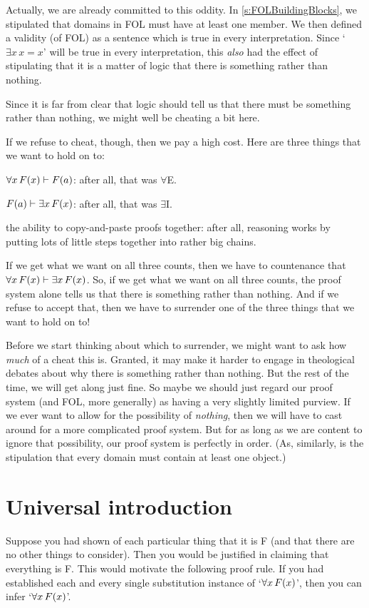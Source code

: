 Actually, we are already committed to this oddity. In \cref{s:FOLBuildingBlocks}, we stipulated that domains in FOL must have at least one member. We then defined a validity (of FOL) as a sentence which is true in every interpretation. Since `$\exists x\, x=x$' will be true in every interpretation, this \emph{also} had the effect of stipulating that it is a matter of logic that there is something rather than nothing.

Since it is far from clear that logic should tell us that there must be something rather than nothing, we might well be cheating a bit here.

If we refuse to cheat, though, then we pay a high cost. Here are three things that we want to hold on to:
	\begin{compactlist}
		\item $\forall x\,\mathord{F}(x) \vdash \mathord{F}(a)$: after all, that was $\forall$E.
		\item $\mathord{F}(a) \vdash \exists x\,\mathord{F}(x)$: after all, that was $\exists$I.
		\item the ability to copy-and-paste proofs together: after all, reasoning works by putting lots of little steps together into rather big chains.
	\end{compactlist}
If we get what we want on all three counts, then we have to countenance that $\forall x\,\mathord{F}(x) \vdash \exists x\,\mathord{F}(x)$. So, if we get what we want on all three counts, the proof system alone tells us that there is something rather than nothing. And if we refuse to accept that, then we have to surrender one of the three things that we want to hold on to!

Before we start thinking about which to surrender, we might want to ask how \emph{much} of a cheat this is. Granted, it may make it harder to engage in theological debates about why there is something rather than nothing. But the rest of the time, we will get along just fine. So maybe we should just regard our proof system (and FOL, more generally) as having a very slightly limited purview. If we ever want to allow for the possibility of \emph{nothing}, then we will have to cast around for a more complicated proof system. But for as long as we are content to ignore that possibility, our proof system is perfectly in order. (As, similarly, is the stipulation that every domain must contain at least one object.)


\section{Universal introduction}
Suppose you had shown of each particular thing that it is F (and that there are no other things to consider). Then you would be justified in claiming that everything is F. This would motivate the following proof rule. If you had established each and every single substitution instance of `$\forall x\,\mathord{F}(x)$', then you can infer `$\forall x\,\mathord{F}(x)$'.

